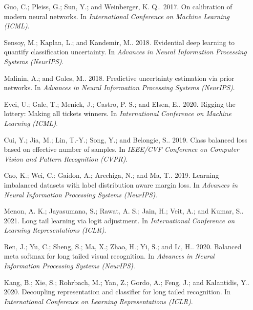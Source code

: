 Guo, C.; Pleiss, G.; Sun, Y.; and Weinberger, K. Q.. 2017. 
\newblock On calibration of modern neural networks. In {\em International Conference on Machine Learning (ICML)}.

Sensoy, M.; Kaplan, L.; and Kandemir, M.. 2018. 
\newblock Evidential deep learning to quantify classification uncertainty. In {\em Advances in Neural Information Processing Systems (NeurIPS)}.

Malinin, A.; and Gales, M.. 2018. 
\newblock Predictive uncertainty estimation via prior networks. In {\em Advances in Neural Information Processing Systems (NeurIPS)}.

Evci, U.; Gale, T.; Menick, J.; Castro, P. S.; and Elsen, E.. 2020. 
\newblock Rigging the lottery: Making all tickets winners. In {\em International Conference on Machine Learning (ICML)}.

Cui, Y.; Jia, M.; Lin, T.-Y.; Song, Y.; and Belongie, S.. 2019. 
\newblock Class balanced loss based on effective number of samples. In {\em IEEE/CVF Conference on Computer Vision and Pattern Recognition (CVPR)}.

Cao, K.; Wei, C.; Gaidon, A.; Arechiga, N.; and Ma, T.. 2019. 
\newblock Learning imbalanced datasets with label distribution aware margin loss. In {\em Advances in Neural Information Processing Systems (NeurIPS)}.

Menon, A. K.; Jayasumana, S.; Rawat, A. S.; Jain, H.; Veit, A.; and Kumar, S.. 2021. 
\newblock Long tail learning via logit adjustment. In {\em International Conference on Learning Representations (ICLR)}.

Ren, J.; Yu, C.; Sheng, S.; Ma, X.; Zhao, H.; Yi, S.; and Li, H.. 2020. 
\newblock Balanced meta softmax for long tailed visual recognition. In {\em Advances in Neural Information Processing Systems (NeurIPS)}.

Kang, B.; Xie, S.; Rohrbach, M.; Yan, Z.; Gordo, A.; Feng, J.; and Kalantidis, Y.. 2020. 
\newblock Decoupling representation and classifier for long tailed recognition. In {\em International Conference on Learning Representations (ICLR)}.


